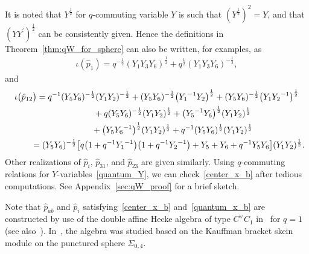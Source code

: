 \documentclass[10pt,a4paper]{amsart}
\numberwithin{equation}{section}
\begin{document}
It is noted that $Y^{\frac{1}{2}}$ for $q$-commuting variable $Y$ is such that $(Y^{\frac{1}{2}})^2= Y$, and that $(Y Y^\prime)^{\frac{1}{2}}$ can be consistently given. Hence the definitions in Theorem~\ref{thm:qW_for_sphere} can also be written, for examples, as
\begin{gather} \label{q_p1}
 \iota(\hat{p}_1) = q^{-\frac{1}{2}} ( Y_1 Y_3 Y_6 )^{\frac{1}{2}} + q^{\frac{1}{2}} ( Y_1 Y_3 Y_6 )^{-\frac{1}{2}} ,
\end{gather}
and
\begin{gather}
 \iota\big(\hat{p}_{12}\big) = q^{-1} ( Y_5 Y_6 )^{-\frac{1}{2}} ( Y_1 Y_2 )^{-\frac{1}{2}} + ( Y_5 Y_6 )^{-\frac{1}{2}} \big({Y_1}^{-1} Y_2 \big)^{\frac{1}{2}} + ( Y_5 Y_6)^{-\frac{1}{2}} \big( Y_1{Y_2}^{-1}\big)^{\frac{1}{2}} \nonumber\\
\hphantom{\iota\big(\hat{p}_{12}\big) =}{} + q (Y_5 Y_6)^{-\frac{1}{2}} ( Y_1 Y_2)^{\frac{1}{2}} + \big( {Y_5}^{- 1} Y_6 \big)^{\frac{1}{2}} (Y_1 Y_2)^{\frac{1}{2}}\nonumber \\
\hphantom{\iota\big(\hat{p}_{12}\big) =}{} + \big( Y_5 {Y_6}^{-1} \big)^{\frac{1}{2}} ( Y_1 Y_2)^{\frac{1}{2}} + q^{-1} (Y_5 Y_6)^{\frac{1}{2}} (Y_1 Y_2 )^{\frac{1}{2}}\nonumber \\
\hphantom{\iota\big(\hat{p}_{12}\big)}{} = ( Y_5 Y_6 )^{-\frac{1}{2}} \big[ q \big( 1+q^{-1} {Y_1}^{-1} \big) \big( 1+q^{-1} {Y_2}^{-1} \big) + Y_5 + Y_6 + q^{-1} Y_5 Y_6 \big] ( Y_1 Y_2)^{\frac{1}{2}} . \label{q_p12}
 \end{gather}
Other realizations of $\hat{p}_i$, $\hat{p}_{31}$, and $\hat{p}_{23}$ are given similarly. Using $q$-commuting relations for $Y$-variables~\eqref{quantum_Y}, we can check~\eqref{center_x_b} after tedious computations. See Appendix~\ref{sec:qW_proof} for a brief sketch.


Note that $\hat{p}_{ab}$ and $\hat{p}_i$ satisfying~\eqref{center_x_b} and~\eqref{quantum_x_b} are constructed by use of the double affine Hecke algebra of type $C^\vee C_1$ in~\cite{Oblom04a} for $q=1$ (see also~\cite{Koorn08a,Terwil13a}). In~\cite{BulloPrzyt99a}, the algebra was studied based on the Kauffman bracket skein module on the punctured sphere $\Sigma_{0,4}$.
\end{document}

